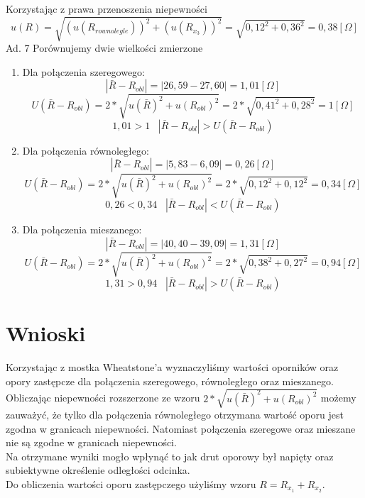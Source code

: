 \documentclass[a4paper,10pt,twoside]{article}
\begin{document}
	 Korzystając z prawa przenoszenia niepewności $$u(R) =\sqrt{(u(R_{rownolegle}))^2 + (u(R_{x_3}))^2} = \sqrt{0,12^2 + 0,36^2} = 0,38[\Omega]$$
	Ad. 7 Porównujemy dwie wielkości zmierzone
	\begin{enumerate}
		\item Dla połączenia szeregowego:
		$$|\bar{R} - R_{obl}| = |26,59 - 27,60| = 1,01[\Omega]$$
		$$U(\bar{R} - R_{obl}) = 2*\sqrt{u(\bar{R})^2 + u(R_{obl})^2} = 2*\sqrt{0,41^2 + 0,28^2} = 1[\Omega]$$ 
		$$1,01 > 1 \hspace{10pt} |\bar{R} - R_{obl}| > U(\bar{R} - R_{obl})$$
		\item Dla połączenia równoległego:
		$$|\bar{R} - R_{obl}| = |5,83 - 6,09| = 0,26[\Omega]$$
		$$U(\bar{R} - R_{obl}) = 2*\sqrt{u(\bar{R})^2 + u(R_{obl})^2} = 2*\sqrt{0,12^2 + 0,12^2} = 0,34[\Omega]$$ 
		$$0,26 < 0,34 \hspace{10pt} |\bar{R} - R_{obl}| < U(\bar{R} - R_{obl})$$
		\item Dla połączenia mieszanego:
		$$|\bar{R} - R_{obl}| = |40,40 - 39,09| = 1,31[\Omega]$$
		$$U(\bar{R} - R_{obl}) = 2*\sqrt{u(\bar{R})^2 + u(R_{obl})^2} = 2*\sqrt{0,38^2 + 0,27^2} = 0,94[\Omega]$$ 
		$$1,31 > 0,94 \hspace{10pt} |\bar{R} - R_{obl}| > U(\bar{R} - R_{obl})$$
	\end{enumerate}
	\section{Wnioski}
Korzystając z mostka Wheatstone'a wyznaczyliśmy wartości oporników oraz opory zastępcze dla połączenia szeregowego, równoległego oraz mieszanego.\\
Obliczając niepewności rozszerzone ze wzoru $2*\sqrt{u(\bar{R})^2 + u(R_{obl})^2}$ możemy zauważyć, że tylko dla połączenia równoległego otrzymana wartość oporu jest zgodna w granicach niepewności. Natomiast połączenia szeregowe oraz mieszane nie są zgodne w granicach niepewności.\\
Na otrzymane wyniki mogło wpłynąć to jak drut oporowy był napięty oraz subiektywne określenie odległości odcinka.	\\
Do obliczenia wartości oporu zastępczego użyliśmy wzoru $R = R_{x_1} + R_{x_2}$.
  
\end{document}
